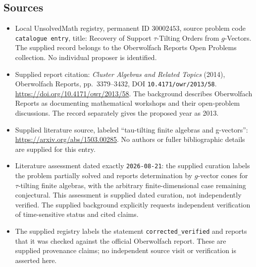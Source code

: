 \documentclass[11pt]{article}
\begin{document}
\subsection{Sources}
\begin{itemize}
\item Local UnsolvedMath registry, permanent ID \(30002453\), source problem code \texttt{catalogue entry}, title: Recovery of Support \(\tau\)-Tilting Orders from \(g\)-Vectors. The supplied record belongs to the Oberwolfach Reports Open Problems collection. No individual proposer is identified.
\item Supplied report citation: \emph{Cluster Algebras and Related Topics} (2014), Oberwolfach Reports, pp.~3379--3432, DOI \texttt{10.4171/owr/2013/58}. \url{https://doi.org/10.4171/owr/2013/58}. The background describes Oberwolfach Reports as documenting mathematical workshops and their open-problem discussions. The record separately gives the proposed year as 2013.
\item Supplied literature source, labeled ``tau-tilting finite algebras and g-vectors'': \url{https://arxiv.org/abs/1503.00285}. No authors or fuller bibliographic details are supplied for this entry.
\item Literature assessment dated exactly \texttt{2026-08-21}: the supplied curation labels the problem partially solved and reports determination by \(g\)-vector cones for \(\tau\)-tilting finite algebras, with the arbitrary finite-dimensional case remaining conjectural. This assessment is supplied dated curation, not independently verified. The supplied background explicitly requests independent verification of time-sensitive status and cited claims.
\item The supplied registry labels the statement \texttt{corrected\_verified} and reports that it was checked against the official Oberwolfach report. These are supplied provenance claims; no independent source visit or verification is asserted here.
\end{itemize}
\end{document}
